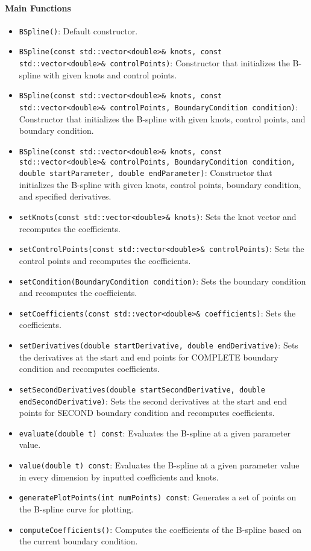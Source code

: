 \documentclass[a4paper]{article}
\begin{document}
\begin{sloppypar}
\paragraph*{Main Functions}
\begin{itemize}
  \item \verb|BSpline()|: Default constructor.
  \item \lstinline|BSpline(const std::vector<double>& knots, const std::vector<double>& controlPoints)|: Constructor that initializes the B-spline with given knots and control points.
  \item \lstinline|BSpline(const std::vector<double>& knots, const std::vector<double>& controlPoints, BoundaryCondition condition)|: Constructor that initializes the B-spline with given knots, control points, and boundary condition.
  \item \lstinline|BSpline(const std::vector<double>& knots, const std::vector<double>& controlPoints, BoundaryCondition condition, double startParameter, double endParameter)|: Constructor that initializes the B-spline with given knots, control points, boundary condition, and specified derivatives.
  \item \verb|setKnots(const std::vector<double>& knots)|: Sets the knot vector and recomputes the coefficients.
  \item \verb|setControlPoints(const std::vector<double>& controlPoints)|: Sets the control points and recomputes the coefficients.
  \item \verb|setCondition(BoundaryCondition condition)|: Sets the boundary condition and recomputes the coefficients.
  \item \verb|setCoefficients(const std::vector<double>& coefficients)|: Sets the coefficients.
  \item \verb|setDerivatives(double startDerivative, double endDerivative)|: Sets the derivatives at the start and end points for COMPLETE boundary condition and recomputes coefficients.
  \item \verb|setSecondDerivatives(double startSecondDerivative, double endSecondDerivative)|: Sets the second derivatives at the start and end points for SECOND boundary condition and recomputes coefficients.
  \item \verb|evaluate(double t) const|: Evaluates the B-spline at a given parameter value.
  \item \verb|value(double t) const|: Evaluates the B-spline at a given parameter value in every dimension by inputted coefficients and knots.
  \item \verb|generatePlotPoints(int numPoints) const|: Generates a set of points on the B-spline curve for plotting.
  \item \verb|computeCoefficients()|: Computes the coefficients of the B-spline based on the current boundary condition.
\end{itemize}


\end{sloppypar}
\end{document}
